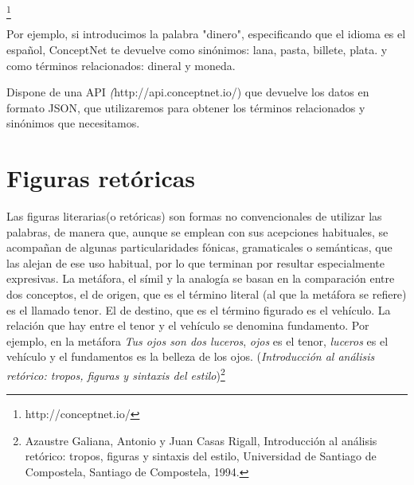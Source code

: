 
\footnote{http://conceptnet.io/}

Por ejemplo, si introducimos la palabra "dinero", especificando que el idioma es el español, ConceptNet te devuelve como sinónimos: lana, pasta, billete, plata. y como términos relacionados: dineral y moneda.

Dispone de una API \textit({http://api.conceptnet.io/}) que devuelve los datos en formato JSON, que utilizaremos para obtener los términos relacionados y sinónimos que necesitamos.

\section{Figuras retóricas}
Las figuras literarias(o retóricas) son formas no convencionales de utilizar las palabras, de manera que, aunque se emplean con sus acepciones habituales, se acompañan de algunas particularidades fónicas, gramaticales o semánticas, que las alejan de ese uso habitual, por lo que terminan por resultar especialmente expresivas. 
La metáfora, el símil y la analogía se basan en la comparación entre dos conceptos, el de origen, que es el término literal (al que la metáfora se refiere) es el llamado tenor. El de destino, que es el término figurado es el vehículo. La relación que hay entre el tenor y el vehículo se denomina fundamento. Por ejemplo, en la metáfora \textit{Tus ojos son dos luceros}, \textit{ojos} es el tenor, \textit{luceros} es el vehículo y el fundamentos es la belleza de los ojos.
(\textit {Introducción al análisis retórico: tropos, figuras y sintaxis del estilo})\footnote{Azaustre Galiana, Antonio y Juan Casas Rigall, Introducción al análisis retórico: tropos, figuras y sintaxis del estilo, Universidad de Santiago de Compostela, Santiago de Compostela, 1994.}

